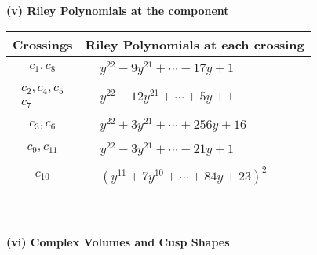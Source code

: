 \documentclass[1p]{elsarticle_modified}
\theoremstyle{definition}
\begin{document}
\newpage\renewcommand{\arraystretch}{1}
\flushleft \textbf{(v) Riley Polynomials at the component}\newline \\
\begin{tabular}{m{50pt}|m{274pt}}
Crossings & \hspace{64pt}Riley Polynomials at each crossing \\
\hline $$\begin{aligned}c_{1},c_{8}\end{aligned}$$&$\begin{aligned}
&y^{22}-9 y^{21}+\cdots-17 y+1
\end{aligned}$\\
\hline $$\begin{aligned}c_{2},c_{4},c_{5}\\c_{7}\end{aligned}$$&$\begin{aligned}
&y^{22}-12 y^{21}+\cdots+5 y+1
\end{aligned}$\\
\hline $$\begin{aligned}c_{3},c_{6}\end{aligned}$$&$\begin{aligned}
&y^{22}+3 y^{21}+\cdots+256 y+16
\end{aligned}$\\
\hline $$\begin{aligned}c_{9},c_{11}\end{aligned}$$&$\begin{aligned}
&y^{22}-3 y^{21}+\cdots-21 y+1
\end{aligned}$\\
\hline $$\begin{aligned}c_{10}\end{aligned}$$&$\begin{aligned}
&(y^{11}+7 y^{10}+\cdots+84 y+23)^{2}
\end{aligned}$\\
\hline
\end{tabular}\\~\\
\newpage\flushleft \textbf{(vi) Complex Volumes and Cusp Shapes}
\end{document}
